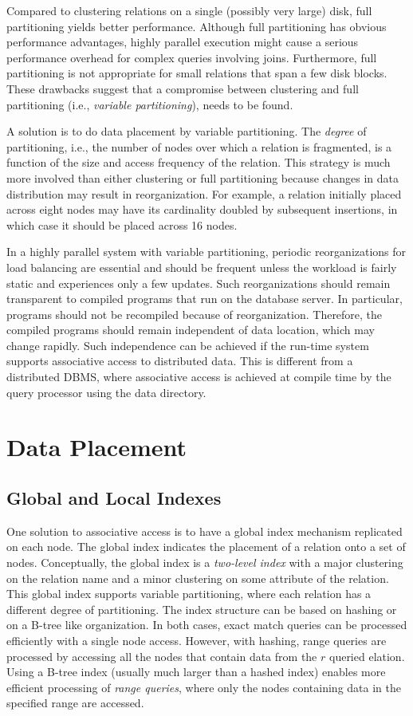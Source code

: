\documentclass{vldb}
\begin{document}
Compared to clustering relations on a single (possibly very large) disk, full partitioning yields better performance. Although full partitioning has obvious performance advantages, highly parallel execution might cause a serious performance overhead for complex queries involving joins. Furthermore, full partitioning is not appropriate for small relations that span a few disk blocks. These drawbacks suggest that a compromise between clustering and full partitioning (i.e., \textit{variable partitioning}), needs to be found.

A solution is to do data placement by variable partitioning. The \textit{degree} of partitioning, i.e., the number of nodes over which a relation is fragmented, is a function of the size and access frequency of the relation. This strategy is much more involved than either clustering or full partitioning because changes in data distribution may result in reorganization. For example, a relation initially placed across eight nodes may have its cardinality doubled by subsequent insertions, in which case it should be placed across 16 nodes.

In a highly parallel system with variable partitioning, periodic reorganizations for load balancing are essential and should be frequent unless the workload is fairly static and experiences only a few updates. Such reorganizations should remain transparent to compiled programs that run on the database server. In particular, programs should not be recompiled because of reorganization. Therefore, the compiled programs should remain independent of data location, which may change rapidly. Such independence can be achieved if the run-time system supports associative access to distributed data. This is different from a distributed DBMS, where associative access is achieved at compile time by the query processor using the data directory.

\section{Data Placement}
\subsection{Global and Local Indexes}
One solution to associative access is to have a global index mechanism replicated on each node. The global index indicates the placement of a relation onto a set of nodes. Conceptually, the global index is a \textit{two-level index} with a major clustering on the relation name and a minor clustering on some attribute of the relation. This global index supports variable partitioning, where each relation has a different degree of partitioning. The index structure can be based on hashing or on a B-tree like organization. In both cases, exact match queries can be processed efficiently with a single node access. However, with hashing, range queries are processed by accessing all the nodes that contain data from the $r$ queried elation. Using a B-tree index (usually much larger than a hashed index) enables more efficient processing of \textit{range queries}, where only the nodes containing data in the specified range are accessed.
\end{document}
